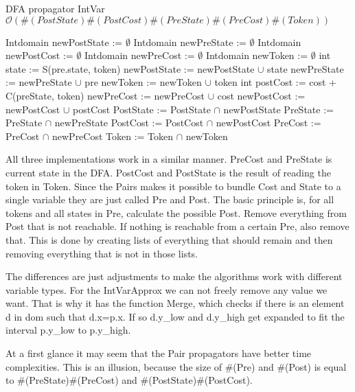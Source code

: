 \documentclass[a4paper,11pt]{article}
\begin{document}
\begin{algorithm}[H]
\caption{DFA propagator IntVar\newline $\mathcal{O}(\#(PostState)\#(PostCost)\#(PreState)\#(PreCost)\#(Token))$}
\begin{algorithmic}[1]
\State Intdomain newPostState := $\emptyset$
\State Intdomain newPreState := $\emptyset$
\State Intdomain newPostCost := $\emptyset$
\State Intdomain newPreCost := $\emptyset$
\State Intdomain newToken := $\emptyset$
		\State int state := S(pre.state, token)
			\State newPostState := newPostState $\cup$ state
			\State newPreState := newPreState $\cup$ pre
			\State newToken := newToken $\cup$ token 
				\State int postCost := cost + C(preState, token)
					\State newPreCost := newPreCost $\cup$ cost
					\State newPostCost := newPostCost $\cup$ postCost
				\EndIf
			\EndFor
		\EndIf
	\EndFor
\EndFor
\State PostState := PostState $\cap$ newPostState
\State PreState := PreState $\cap$ newPreState
\State PostCost := PostCost $\cap$ newPostCost
\State PreCost := PreCost $\cap$ newPreCost
\State Token := Token $\cap$ newToken
\EndProcedure
\end{algorithmic}
\end{algorithm}
All three implementations work in a similar manner. PreCost and PreState is current state in the DFA. PostCost and PostState is the result of reading the token in Token. Since the Pairs makes it possible to bundle Cost and State to a single variable they are just called Pre and Post. The basic principle is, for all tokens and all states in Pre, calculate the possible Post. Remove everything from Post that is not reachable. If nothing is reachable from a certain Pre, also remove that. This is done by creating lists of everything that should remain and then removing everything that is not in those lists.

The differences are just adjustments to make the algorithms work with different variable types. For the IntVarApprox we can not freely remove any value we want. That is why it has the function Merge, which checks if there is an element d in dom such that d.x=p.x. If so d.y\_low and d.y\_high get expanded to fit the interval p.y\_low to p.y\_high.

At a first glance it may seem that the Pair propagators have better time complexities. This is an illusion, because the size of \#(Pre) and \#(Post) is equal to \#(PreState)\#(PreCost) and \#(PostState)\#(PostCost).
\end{document}
